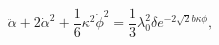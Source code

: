 \begin{equation}
\ddot{\alpha}+2 \dot{\alpha}^2 +\frac{1}{6} \kappa^2 \dot{\phi}^2
=\frac{1}{3} \lambda_0^2 \delta e^{-2 \sqrt{2} b \kappa \phi},
\end{equation}

